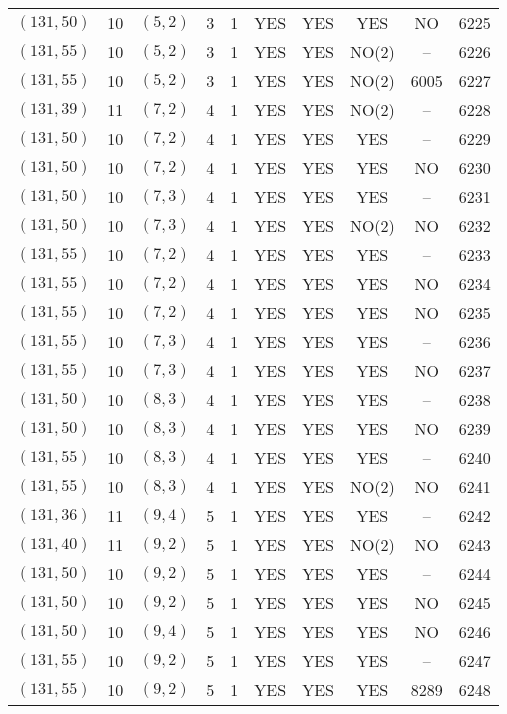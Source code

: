 \begin{longtable}{|c|c|c|c|c|c|c|c|c|c|}
$(131, 50)$ & 10 & $(5, 2)$ & 3 & 1 & YES & YES & YES & NO & 6225\\
$(131, 55)$ & 10 & $(5, 2)$ & 3 & 1 & YES & YES & NO(2) & -- & 6226\\
$(131, 55)$ & 10 & $(5, 2)$ & 3 & 1 & YES & YES & NO(2) & 6005 & 6227\\
$(131, 39)$ & 11 & $(7, 2)$ & 4 & 1 & YES & YES & NO(2) & -- & 6228\\
$(131, 50)$ & 10 & $(7, 2)$ & 4 & 1 & YES & YES & YES & -- & 6229\\
$(131, 50)$ & 10 & $(7, 2)$ & 4 & 1 & YES & YES & YES & NO & 6230\\
$(131, 50)$ & 10 & $(7, 3)$ & 4 & 1 & YES & YES & YES & -- & 6231\\
$(131, 50)$ & 10 & $(7, 3)$ & 4 & 1 & YES & YES & NO(2) & NO & 6232\\
$(131, 55)$ & 10 & $(7, 2)$ & 4 & 1 & YES & YES & YES & -- & 6233\\
$(131, 55)$ & 10 & $(7, 2)$ & 4 & 1 & YES & YES & YES & NO & 6234\\
$(131, 55)$ & 10 & $(7, 2)$ & 4 & 1 & YES & YES & YES & NO & 6235\\
$(131, 55)$ & 10 & $(7, 3)$ & 4 & 1 & YES & YES & YES & -- & 6236\\
$(131, 55)$ & 10 & $(7, 3)$ & 4 & 1 & YES & YES & YES & NO & 6237\\
$(131, 50)$ & 10 & $(8, 3)$ & 4 & 1 & YES & YES & YES & -- & 6238\\
$(131, 50)$ & 10 & $(8, 3)$ & 4 & 1 & YES & YES & YES & NO & 6239\\
$(131, 55)$ & 10 & $(8, 3)$ & 4 & 1 & YES & YES & YES & -- & 6240\\
$(131, 55)$ & 10 & $(8, 3)$ & 4 & 1 & YES & YES & NO(2) & NO & 6241\\
$(131, 36)$ & 11 & $(9, 4)$ & 5 & 1 & YES & YES & YES & -- & 6242\\
$(131, 40)$ & 11 & $(9, 2)$ & 5 & 1 & YES & YES & NO(2) & NO & 6243\\
$(131, 50)$ & 10 & $(9, 2)$ & 5 & 1 & YES & YES & YES & -- & 6244\\
$(131, 50)$ & 10 & $(9, 2)$ & 5 & 1 & YES & YES & YES & NO & 6245\\
$(131, 50)$ & 10 & $(9, 4)$ & 5 & 1 & YES & YES & YES & NO & 6246\\
$(131, 55)$ & 10 & $(9, 2)$ & 5 & 1 & YES & YES & YES & -- & 6247\\
$(131, 55)$ & 10 & $(9, 2)$ & 5 & 1 & YES & YES & YES & 8289 & 6248\\

\end{longtable}
